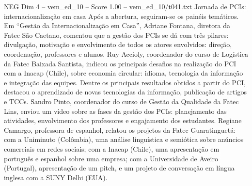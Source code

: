 \begin{textsample}{NEG Dim 4 – vem\_ed\_10 – Score 1.00 – vem\_ed\_10/t041.txt}  \label{ex:f4_neg_031}
Jornada de PCIs: internacionalização em casa Após a abertura, seguiram-se os painéis temáticos.
Em “Gestão da Internacionalização em Casa”, Adriane Fontana, diretora da Fatec São Caetano, comentou que a gestão dos PCIs se dá com três pilares: divulgação, motivação e envolvimento de todos os atores envolvidos: direção, coordenação, professores e alunos.
Ruy Accioly, coordenador do curso de Logística da Fatec Baixada Santista, indicou os principais desafios na realização do PCI com a Inacap (Chile), sobre economia circular: idioma, tecnologia da informação e integração das equipes.
Dentre os principais resultados obtidos a partir do PCI, destacou o aprendizado de novas tecnologias da informação, publicação de artigos e TCCs.
Sandro Pinto, coordenador do curso de Gestão da Qualidade da Fatec Lins, enviou um vídeo sobre as fases da gestão dos PCIs: planejamento das atividades, envolvimento dos professores e engajamento dos estudantes.
Regiane Camargo, professora de espanhol, relatou os projetos da Fatec Guaratinguetá: com a Uniminuto (Colômbia), uma análise linguística e semiótica sobre anúncios comerciais em redes sociais; com a Inacap (Chile), uma apresentação em português e espanhol sobre uma empresa; com a Universidade de Aveiro (Portugal), apresentação de um pitch, e um projeto de conversação em língua inglesa com a SUNY Delhi (EUA).

\end{textsample}
